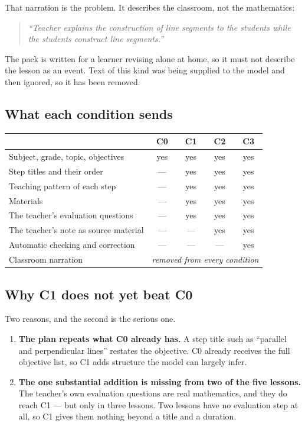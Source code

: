 \documentclass[11pt,a4paper]{article}
\newcommand{\q}[1]{\begin{quote}\itshape #1\end{quote}}
\begin{document}
That narration is the problem. It describes the classroom, not the mathematics:

\q{``Teacher explains the construction of line segments to the students while the students
construct line segments.''}

\noindent The pack is written for a learner revising alone at home, so it must not describe
the lesson as an event. Text of this kind was being supplied to the model and then ignored,
so it has been removed.

\subsection{What each condition sends}

\begin{center}
\begin{tabular}{@{}lcccc@{}}
\toprule
& \textbf{C0} & \textbf{C1} & \textbf{C2} & \textbf{C3}\\
\midrule
Subject, grade, topic, objectives & yes & yes & yes & yes\\
Step titles and their order & --- & yes & yes & yes\\
Teaching pattern of each step & --- & yes & yes & yes\\
Materials & --- & yes & yes & yes\\
The teacher's evaluation questions & --- & yes & yes & yes\\
The teacher's note as source material & --- & --- & yes & yes\\
Automatic checking and correction & --- & --- & --- & yes\\
\midrule
Classroom narration & \multicolumn{4}{c}{\emph{removed from every condition}}\\
\bottomrule
\end{tabular}
\end{center}

\subsection{Why C1 does not yet beat C0}

Two reasons, and the second is the serious one.

\begin{enumerate}
\item \textbf{The plan repeats what C0 already has.} A step title such as ``parallel and
perpendicular lines'' restates the objective. C0 already receives the full objective list,
so C1 adds structure the model can largely infer.

\item \textbf{The one substantial addition is missing from two of the five lessons.} The
teacher's own evaluation questions are real mathematics, and they do reach C1 --- but only
in three lessons. Two lessons have no evaluation step at all, so C1 gives them nothing
beyond a title and a duration.
\end{enumerate}
\end{document}
